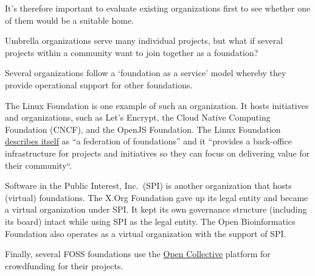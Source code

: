 It's therefore important to evaluate existing organizations first to see whether one of them would be a suitable home.

\newpage

\begin{kaobox}[frametitle=Foundation as a service]

Umbrella organizations serve many individual projects, but what if several projects within a community want to join together as a foundation?

Several organizations follow a `foundation as a service' model whereby they provide operational support for other foundations.

The Linux Foundation is one example of such an organization.  It hosts initiatives and organizations, such as Let's Encrypt, the Cloud Native Computing Foundation (CNCF), and the OpenJS Foundation.  The Linux Foundation \href{https://www.linuxfoundation.org/join}{describes itself} as ``a federation of foundations'' and it ``provides a back-office infrastructure for projects and initiatives so they can focus on delivering value for their community``.

Software in the Public Interest, Inc.\ (SPI) is another organization that hosts (virtual) foundations.  The X.Org Foundation gave up its legal entity and became a virtual organization under SPI.  It kept its own governance structure (including its board) intact while using SPI as the legal entity.  The Open Bioinformatics Foundation also operates as a virtual organization with the support of SPI.

Finally, several FOSS foundations use the \href{https://opencollective.com/}{Open Collective} platform for crowdfunding for their projects.

\end{kaobox}

